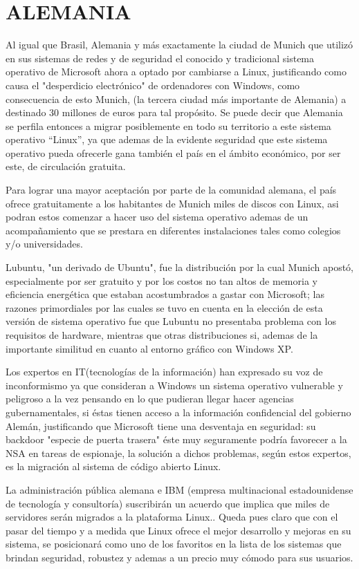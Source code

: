 \section*{ALEMANIA}
Al igual que Brasil, Alemania y más exactamente la ciudad de Munich que utilizó en sus sistemas de redes y  de seguridad el conocido y tradicional sistema operativo de 
Microsoft ahora a optado por cambiarse a Linux, justificando como causa el "desperdicio electrónico" de ordenadores con Windows, como consecuencia de esto Munich, (la 
tercera ciudad más importante de Alemania) a destinado 30 millones de euros para tal propósito. Se puede decir que Alemania se perfila entonces a migrar posiblemente en 
todo su territorio a este sistema operativo “Linux”, ya que ademas de la evidente seguridad que este sistema operativo pueda ofrecerle gana también el país en el ámbito 
económico, por ser este, de circulación gratuita.

Para lograr una mayor aceptación por parte de la comunidad alemana, el país ofrece gratuitamente a los habitantes de Munich  miles de discos con Linux, asi podran estos 
comenzar a hacer uso del sistema operativo ademas de un acompañamiento que se prestara en diferentes instalaciones tales como colegios y/o universidades.

Lubuntu, "un derivado de Ubuntu", fue la distribución por la cual Munich apostó, especialmente por ser gratuito y por los costos no tan altos de memoria y eficiencia 
energética que estaban acostumbrados a gastar con Microsoft; las razones primordiales por las cuales se tuvo en cuenta en la elección de esta versión de sistema operativo 
fue que Lubuntu no presentaba problema con los requisitos de hardware, mientras que otras distribuciones si, ademas de la importante similitud en cuanto al entorno gráfico 
con Windows XP.

Los expertos en IT(tecnologías de la información) han expresado su voz de inconformismo ya que consideran a Windows un sistema operativo vulnerable y peligroso a la vez 
pensando en lo que pudieran llegar hacer agencias gubernamentales, si éstas tienen acceso a la información confidencial del gobierno Alemán, justificando que Microsoft 
tiene una desventaja en seguridad: su backdoor "especie de puerta trasera" éste muy seguramente podría favorecer a la NSA en tareas de espionaje, la solución a dichos 
problemas, según estos expertos, es la migración al sistema de código abierto Linux.

La administración pública alemana e IBM (empresa multinacional estadounidense de tecnología y consultoría) suscribirán un acuerdo que implica que miles de servidores serán 
migrados a la plataforma Linux.. Queda pues claro que con el pasar del tiempo y a medida que Linux ofrece el mejor desarrollo y mejoras en su sistema, se posicionará como 
uno de los favoritos en la lista de los sistemas que brindan seguridad, robustez y ademas a un precio muy cómodo para sus usuarios.